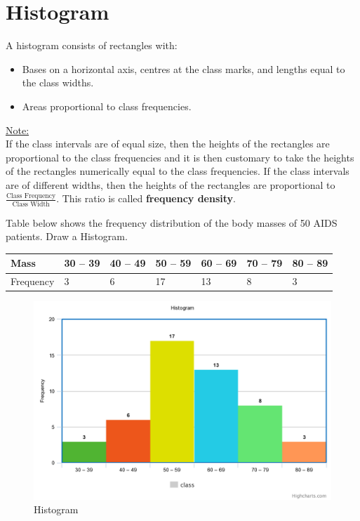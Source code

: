 \documentclass[
]{book}
\begin{document}
\hypertarget{histogram}{%
\section{Histogram}\label{histogram}}

A histogram consists of rectangles with:

\begin{itemize}
\item
  Bases on a horizontal axis, centres at the class marks, and lengths equal to the class widths.
\item
  Areas proportional to class frequencies.
\end{itemize}

\underline{Note:}\\
If the class intervals are of equal size, then the heights of the rectangles are proportional to the class frequencies and it is then customary to take the heights of the rectangles numerically equal to the class frequencies. If the class intervals are of different widths, then
the heights of the rectangles are proportional to \(\frac{\text{Class Frequency}}{\text{Class Width}}\). This ratio is called \textbf{frequency density}.

Table below shows the frequency distribution of the body masses of 50 AIDS patients. Draw a Histogram.

\begin{longtable}[]{@{}lllllll@{}}
\toprule
Mass & 30 -- 39 & 40 -- 49 & 50 -- 59 & 60 -- 69 & 70 -- 79 & 80 -- 89 \\
\midrule
\endhead
Frequency & 3 & 6 & 17 & 13 & 8 & 3 \\
\bottomrule
\end{longtable}

\begin{figure}

{\centering \includegraphics[width=0.7\linewidth]{images/image8} 

}

\caption{Histogram}\label{fig:hist1}
\end{figure}
\end{document}
